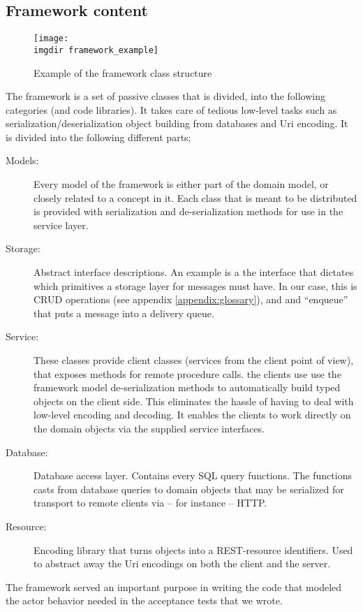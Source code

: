 \subsection{Framework content}
\label{ssec:openreception_framework}
\begin{figure}[!htbp]
\texttt{[image: \\imgdir framework\_example]}
\centering
\caption{Example of the framework class structure}
\label{fig:framework_example}
\end{figure}
\noindent
The framework is a set of passive classes that is divided, into the following categories (and code libraries). It takes care of tedious low-level tasks such as serialization/deserialization object building from databases and Uri encoding. It is divided into the following different parts;
\begin{description}
  \item[Models:] Every model of the framework is either part of the domain model, or closely related to a concept in it. Each class that is meant to be distributed is provided with serialization and de-serialization methods for use in the service layer.
  \item[Storage:] Abstract interface descriptions. An example is a the interface that dictates which primitives a storage layer for messages must have. In our case, this is CRUD operations (see appendix \ref{appendix:glossary}), and and ``enqueue'' that puts a message into a delivery queue.
  \item[Service:] These classes provide client classes (services from the client point of view), that exposes methods for remote procedure calls. the clients use  use the framework model de-serialization methods to automatically build typed objects on the client side. This eliminates the hassle of having to deal with low-level encoding and decoding. It enables the clients to work directly on the domain objects via the supplied service interfaces.
  \item[Database:] Database access layer. Contains every SQL query functions. The functions casts from database queries to domain objects that may be serialized for transport to remote clients via -- for instance -- HTTP.
  \item[Resource:] Encoding library that turns objects into a REST-resource identifiers. Used to abstract away the Uri encodings on both the client and the server.
\end{description}
The framework served an important purpose in writing the code that modeled the actor behavior needed in the acceptance tests that we wrote.
